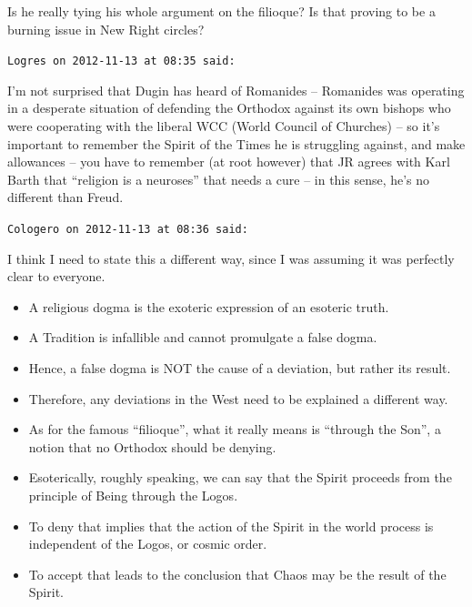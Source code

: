 \begin{footnotesize}
\begin{sffamily}
Is he really tying his whole argument on the filioque? Is that proving to be a burning issue in New Right circles?

\hfill

\texttt{Logres on 2012-11-13 at 08:35 said:}

I'm not surprised that Dugin has heard of Romanides -- Romanides was operating in a desperate situation of defending the Orthodox against its own bishops who were cooperating with the liberal WCC (World Council of Churches) -- so it's important to remember the Spirit of the Times he is struggling against, and make allowances -- you have to remember (at root however) that JR agrees with Karl Barth that ``religion is a neuroses'' that needs a cure -- in this sense, he's no different than Freud.

\hfill

\texttt{Cologero on 2012-11-13 at 08:36 said:}

I think I need to state this a different way, since I was assuming it was perfectly clear to everyone.

\begin{itemize}


\item A religious dogma is the exoteric expression of an esoteric truth.

\item A Tradition is infallible and cannot promulgate a false dogma.

\item Hence, a false dogma is NOT the cause of a deviation, but rather its result.

\item Therefore, any deviations in the West need to be explained a different way.

\item As for the famous ``filioque'', what it really means is ``through the Son'', a notion that no Orthodox should be denying.

\item Esoterically, roughly speaking, we can say that the Spirit proceeds from the principle of Being through the Logos.

\item To deny that implies that the action of the Spirit in the world process is independent of the Logos, or cosmic order.

\item To accept that leads to the conclusion that Chaos may be the result of the Spirit.


\end{itemize}
\end{sffamily}
\end{footnotesize}
